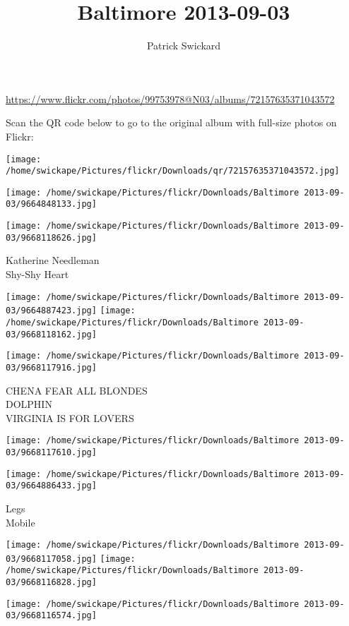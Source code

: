 \documentclass[10pt,letterpaper]{article}
\title{Baltimore 2013-09-03}
\author{Patrick Swickard}
\date{}
\begin{document}
\maketitle

\url{https://www.flickr.com/photos/99753978@N03/albums/72157635371043572}

Scan the QR code below to go to the original album with full-size photos on Flickr:

\texttt{[image: /home/swickape/Pictures/flickr/Downloads/qr/72157635371043572.jpg]}
\pagebreak

\texttt{[image: /home/swickape/Pictures/flickr/Downloads/Baltimore 2013-09-03/9664848133.jpg]}

\vspace{0.25in}
\texttt{[image: /home/swickape/Pictures/flickr/Downloads/Baltimore 2013-09-03/9668118626.jpg]}

Katherine Needleman\\
Shy{-}Shy Heart
\pagebreak

\texttt{[image: /home/swickape/Pictures/flickr/Downloads/Baltimore 2013-09-03/9664887423.jpg]}
\texttt{[image: /home/swickape/Pictures/flickr/Downloads/Baltimore 2013-09-03/9668118162.jpg]}

\vspace{0.25in}
\texttt{[image: /home/swickape/Pictures/flickr/Downloads/Baltimore 2013-09-03/9668117916.jpg]}

CHENA FEAR ALL BLONDES\\
DOLPHIN\\
VIRGINIA IS FOR LOVERS
\pagebreak

\texttt{[image: /home/swickape/Pictures/flickr/Downloads/Baltimore 2013-09-03/9668117610.jpg]}

\vspace{0.25in}
\texttt{[image: /home/swickape/Pictures/flickr/Downloads/Baltimore 2013-09-03/9664886433.jpg]}

Legs\\
Mobile
\pagebreak

\texttt{[image: /home/swickape/Pictures/flickr/Downloads/Baltimore 2013-09-03/9668117058.jpg]}
\texttt{[image: /home/swickape/Pictures/flickr/Downloads/Baltimore 2013-09-03/9668116828.jpg]}

\vspace{0.25in}
\texttt{[image: /home/swickape/Pictures/flickr/Downloads/Baltimore 2013-09-03/9668116574.jpg]}
\end{document}
